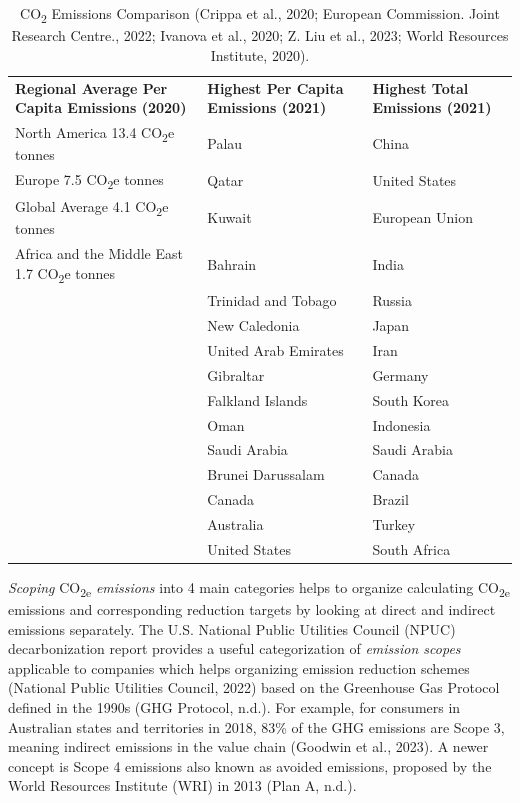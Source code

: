 \documentclass[
  12pt,
  letterpaper,
  DIV=11,
  numbers=noendperiod]{scrartcl}
\begin{document}
\begin{longtable}[]{@{}
  >{\raggedright\arraybackslash}p{}
  >{\raggedright\arraybackslash}p{}
  >{\raggedright\arraybackslash}p{}@{}}
\caption[Regional CO~2~ Emissions Comparison]{CO\textsubscript{2}
Emissions Comparison (Crippa et al., 2020; European Commission. Joint
Research Centre., 2022; Ivanova et al., 2020; Z. Liu et al., 2023; World
Resources Institute, 2020).}\tabularnewline
\toprule\noalign{}
\endfirsthead
\endhead
\bottomrule\noalign{}
\endlastfoot
\textbf{Regional Average Per Capita Emissions (2020)} & \textbf{Highest
Per Capita Emissions (2021)} & \textbf{Highest Total Emissions
(2021)} \\
North America 13.4 CO\textsubscript{2}e tonnes & Palau & China \\
Europe 7.5 CO\textsubscript{2}e tonnes & Qatar & United States \\
Global Average 4.1 CO\textsubscript{2}e tonnes & Kuwait & European
Union \\
Africa and the Middle East 1.7 CO\textsubscript{2}e tonnes & Bahrain &
India \\
& Trinidad and Tobago & Russia \\
& New Caledonia & Japan \\
& United Arab Emirates & Iran \\
& Gibraltar & Germany \\
& Falkland Islands & South Korea \\
& Oman & Indonesia \\
& Saudi Arabia & Saudi Arabia \\
& Brunei Darussalam & Canada \\
& Canada & Brazil \\
& Australia & Turkey \\
& United States & South Africa \\
\end{longtable}

\let\pandoctableshortcapt\relax

\emph{Scoping} CO\textsubscript{2e} \emph{emissions} into 4 main
categories helps to organize calculating CO\textsubscript{2e} emissions
and corresponding reduction targets by looking at direct and indirect
emissions separately. The U.S. National Public Utilities Council (NPUC)
decarbonization report provides a useful categorization of
\emph{emission scopes} applicable to companies which helps organizing
emission reduction schemes (National Public Utilities Council, 2022)
based on the Greenhouse Gas Protocol defined in the 1990s (GHG Protocol,
n.d.). For example, for consumers in Australian states and territories
in 2018, 83\% of the GHG emissions are Scope 3, meaning indirect
emissions in the value chain (Goodwin et al., 2023). A newer concept is
Scope 4 emissions also known as avoided emissions, proposed by the World
Resources Institute (WRI) in 2013 (Plan A, n.d.).
\end{document}
